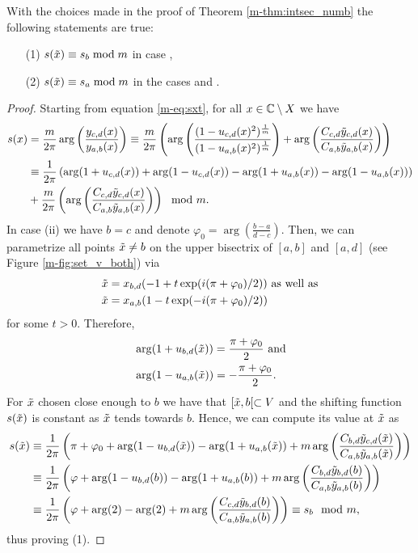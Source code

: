 \documentclass[main.tex]{subfiles}
\begin{document}
\begin{lemma}\label{lemma:sxt=sx}
  With the choices made in the proof of Theorem \ref{m-thm:intsec_numb} the following statements are true:
  \begin{itemize}
   \item[(1)] $s(\tilde{x}) \equiv s_b \bmod m$ in case {},
    \item[(2)]  $s(\tilde{x}) \equiv s_a \bmod m$ in the cases {} and {}.
  \end{itemize}
\end{lemma}
 \begin{proof}
 Starting from equation \eqref{m-eq:sxt}, for all $x \in \mathbb{C} \setminus X$ we have
   \begin{align*}
   s(x) & = \frac{m}{2\pi} \arg \left( \frac{y_{c,d}(x)}{y_{a,b}(x)} \right)
   \equiv \frac{m}{2\pi} \left( \arg \left( \frac{(1- u_{c,d}(x)^2)^{\frac{1}{m}}}{(1-u_{a,b}(x)^2)^{\frac{1}{m}}} \right) + \arg \left( \frac{ C_{c,d} \tilde{y}_{c,d}(x)}{C_{a,b}
   \tilde{y}_{a,b}(x)} \right) \right) \\
   & \equiv \frac{1}{2\pi} \left( \arg(1+u_{c,d}(x)) + \arg(1-u_{c,d}(x)) - \arg(1+u_{a,b}(x)) - \arg(1-u_{a,b}(x)) \right) \\
   & +  \frac{m}{2\pi} \left( \arg \left( \frac{ C_{c,d} \tilde{y}_{c,d}(x)}{C_{a,b}\tilde{y}_{a,b}(x)} \right)\right) \mod m.
  \end{align*}
 In case (ii) we have $b = c$ and denote $\varphi_0 = \arg \left( \frac{b-a}{d-c} \right)$. Then, we can parametrize all points $\tilde{x} \ne b$ on
 the upper bisectrix of $[a,b]$ and
 $[a,d]$ (see Figure \ref{m-fig:set_v_both}) via
 \begin{align*}
  \tilde{x} & = x_{b,d}(-1+t \exp(i(\pi+\varphi_0)/2)) \text{  as well as} \\
  \tilde{x} & = x_{a,b}(1-t \exp(-i (\pi+\varphi_0)/2))
 \end{align*}
 for some $t > 0$. Therefore,
 \begin{align*}
   & \arg (1+u_{b,d}(\tilde{x})) = \frac{\pi+\varphi_0}{2} \text{ and} \\
   & \arg (1-u_{a,b}(\tilde{x})) = -\frac{\pi+\varphi_0}{2}.
 \end{align*}
 For $\tilde{x}$ chosen close enough to $b$ we have that $[\tilde{x},b[ \subset V$ and the shifting function $s(\tilde{x})$ is constant as $\tilde{x}$ tends towards $b$. Hence,
 we can compute its value at $\tilde{x}$ as
 \begin{align*}
  s(\tilde{x}) & \equiv \frac{1}{2\pi} \left( \pi + \varphi_0 + \arg(1-u_{b,d}(\tilde{x})) - \arg(1+u_{a,b}(\tilde{x})) +  m \arg \left( \frac{ C_{b,d} \tilde{y}_{c,d}(\tilde{x})}{C_{a,b}\tilde{y}_{a,b}(\tilde{x})} \right)\right) \\
	 & \equiv \frac{1}{2\pi} \left ( \varphi +\arg(1-u_{b,d}(b)) - \arg(1+u_{a,b}(b)) +  m \arg \left( \frac{ C_{b,d} \tilde{y}_{b,d}(b)}{C_{a,b}\tilde{y}_{a,b}(b)} \right)\right) \\
	 & \equiv \frac{1}{2\pi} \left( \varphi +\arg(2) - \arg(2) +  m \arg \left( \frac{ C_{c,d} \tilde{y}_{b,d}(b)}{C_{a,b}\tilde{y}_{a,b}(b)} \right)\right) \equiv s_b \mod m,
 \end{align*}
thus proving (1).


\end{proof}
\end{document}
